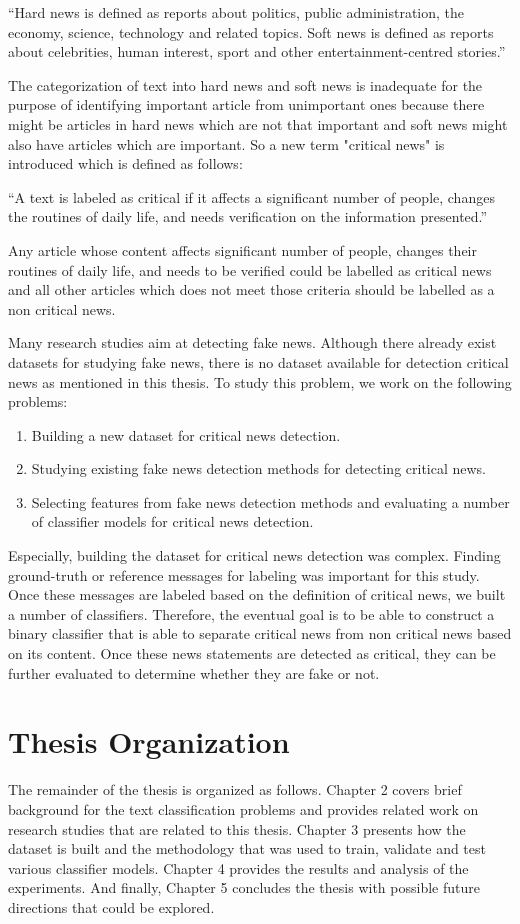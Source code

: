 \enquote{Hard news is defined as reports about politics, public administration, the economy, science, technology and related topics. Soft news is defined as reports about celebrities, human interest, sport and other entertainment-centred stories.}

The categorization of text into hard news and soft news is inadequate for the purpose of identifying important article from unimportant ones because there might be articles in hard news which are not that important and soft news might also have articles which are important. So a new term "critical news" is introduced which is defined as follows:

\enquote{A text is labeled as critical if it affects a significant number of people, changes the routines of daily life, and needs verification on the information presented.}

Any article whose content affects significant number of people, changes their routines of daily life, and needs to be verified could be labelled as critical news and all other articles which does not meet those criteria should be labelled as a non critical news. 

Many research studies aim at detecting fake news. Although there already exist datasets for studying fake news, there is no dataset available for detection critical news as mentioned in this thesis. To study this problem, we work on the following problems:

\begin{enumerate}
    \item Building a new dataset for critical news detection.
    \item Studying existing fake news detection methods for detecting critical news.
    \item Selecting features from fake news detection methods and evaluating a number of classifier models for critical news detection.
\end{enumerate}

Especially, building the dataset for critical news detection was complex. Finding ground-truth or reference messages for labeling was important for this study. Once these messages are labeled based on the definition of critical news, we built a number of classifiers. Therefore, the eventual goal is to be able to construct a binary classifier that is able to separate critical news from non critical news based on its content. Once these news statements are detected as critical, they can be further evaluated to determine whether they are fake or not.


\section{Thesis Organization} \label{intro:organization}
The remainder of the thesis is organized as follows. Chapter 2 covers brief background for the text classification problems and provides related work on research studies that are related to this thesis. Chapter 3 presents how the dataset is built and the methodology that was used to train, validate and test various classifier models. Chapter 4  provides the results and analysis of the experiments. And finally, Chapter 5 concludes the thesis with possible future directions that could be explored.